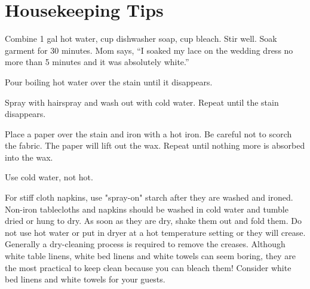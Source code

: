 \chapter*{Housekeeping Tips}

 \par
\begin{minipage}{\linewidth}
Combine 1 gal hot water,  cup dishwasher soap,  cup bleach. Stir well. Soak garment for 30 minutes.  Mom says, ``I soaked my lace on the wedding dress no more than 5 minutes and it was absolutely white.''
\end{minipage}\par

\begin{minipage}{\linewidth}
Pour boiling hot water over the stain until it disappears.
\end{minipage}\par

\begin{minipage}{\linewidth}
Spray with hairspray and wash out with cold water. Repeat until the stain disappears.
\end{minipage}\par

\begin{minipage}{\linewidth}
Place a paper over the stain and iron with a hot iron. Be careful not to scorch the fabric. The paper will lift out the wax. Repeat until nothing more is absorbed into the wax.
\end{minipage}\par

\begin{minipage}{\linewidth}
Use cold water, not hot.
\end{minipage}\par

\begin{minipage}{\linewidth}
For stiff cloth napkins, use "spray-on" starch after they are washed and ironed.
Non-iron tablecloths and napkins should be washed in cold water and tumble dried or hung to dry. As soon as they are dry, shake them out and fold them. Do not use hot water or put in dryer at a hot temperature setting or they will crease. Generally a dry-cleaning process is required to remove the creases.
Although white table linens, white bed linens and white towels can seem boring, they are the most practical to keep clean because you can bleach them! Consider white bed linens and white towels for your guests.
\end{minipage}\par

